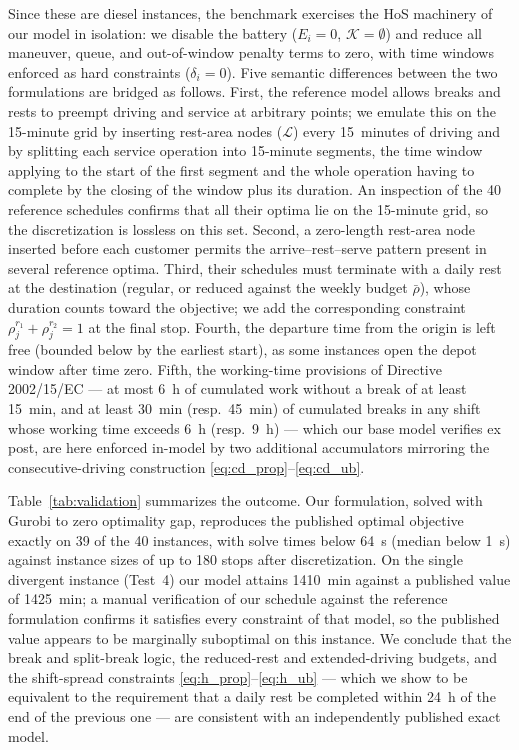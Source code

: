 Since these are diesel instances, the benchmark exercises the HoS machinery of
our model in isolation: we disable the battery ($E_i = 0$,
$\mathcal K = \emptyset$) and reduce all maneuver, queue, and out-of-window
penalty terms to zero, with time windows enforced as hard constraints
($\delta_i = 0$). Five semantic differences between the two formulations are
bridged as follows. First, the reference model allows breaks and rests to
preempt driving and service at arbitrary points; we emulate this on the
15-minute grid by inserting rest-area nodes ($\mathcal L$) every 15~minutes of
driving and by splitting each service operation into 15-minute segments, the
time window applying to the start of the first segment and the whole
operation having to complete by the closing of the window plus its duration.
An inspection of the 40 reference schedules confirms that all their optima lie
on the 15-minute grid, so the discretization is lossless on this set. Second,
a zero-length rest-area node inserted before each customer permits the
arrive--rest--serve pattern present in several reference optima. Third, their
schedules must terminate with a daily rest at the destination (regular, or
reduced against the weekly budget $\bar\rho$), whose duration counts toward
the objective; we add the corresponding constraint
$\rho^{r_1}_{j} + \rho^{r_2}_{j} = 1$ at the final stop. Fourth, the departure
time from the origin is left free (bounded below by the earliest start), as
some instances open the depot window after time zero. Fifth, the working-time
provisions of Directive 2002/15/EC --- at most 6~h of cumulated work without a
break of at least 15~min, and at least 30~min (resp.\ 45~min) of cumulated
breaks in any shift whose working time exceeds 6~h (resp.\ 9~h) --- which our
base model verifies ex post, are here enforced in-model by two additional
accumulators mirroring the consecutive-driving construction
\eqref{eq:cd_prop}--\eqref{eq:cd_ub}.

Table~\ref{tab:validation} summarizes the outcome. Our formulation, solved
with Gurobi to zero optimality gap, reproduces the published optimal objective
exactly on 39 of the 40 instances, with solve times below 64~s (median below
1~s) against instance sizes of up to 180 stops after discretization. On the
single divergent instance (Test~4) our model attains 1410~min against a
published value of 1425~min; a manual verification of our schedule against
the reference formulation confirms it satisfies every constraint of that
model, so the published value appears to be marginally suboptimal on this
instance. We conclude that the break and split-break logic, the reduced-rest
and extended-driving budgets, and the shift-spread constraints
\eqref{eq:h_prop}--\eqref{eq:h_ub} --- which we show to be equivalent to the
requirement that a daily rest be completed within 24~h of the end of the
previous one --- are consistent with an independently published exact model.

